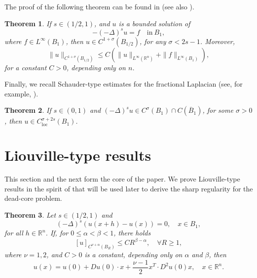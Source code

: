 \documentclass[11pt,reqno]{amsart}
\newtheorem{theorem}{Theorem}
\numberwithin{equation}{section}
\numberwithin{theorem}{section}
\numberwithin{lemma}{section}
\numberwithin{corollary}{section}
\numberwithin{remark}{section}
\numberwithin{proposition}{section}
\numberwithin{definition}{section}
\newcommand{\R}{\mathbb{R}}
\newcommand{\loc}{\operatorname{loc}}
\begin{document}
The proof of the following theorem can be found in \cite[Theorem 61]{CS11} (see also \cite[Theorem 52]{CS11}).

\begin{theorem}\label{CNtheorem}
If $s\in\left(1/2,1\right)$, and $u$ is a bounded solution of
$$
-(-\Delta)^su=f \quad \textrm{in} \ B_1,
$$
where $f\in L^\infty(B_1)$, then $u\in C^{1+\sigma}(B_{1/2})$, for any $\sigma<2s-1$. Moreover,
$$
\|u\|_{C^{1+\sigma}(B_{1/2})}\le C\left(\|u\|_{L^\infty(\R^n)}+\|f\|_{L^\infty(B_1)}\right),
$$
for a constant $C>0$, depending only on $n$.
\end{theorem}

Finally, we recall Schauder-type estimates for the fractional Laplacian (see, for example, \cite[Remark 9.1]{T24}).

\begin{theorem}\label{Schauder}
    If $s\in(0,1)$ and $(-\Delta)^su\in C^\sigma (B_1)\cap C(\overline{B}_1)$, for some $\sigma>0$, then $u\in C_{\loc}^{\sigma+2s}(B_1)$.
\end{theorem}

\medskip

\section{Liouville-type results}\label{s3}

This section and the next form the core of the paper. We prove Liouville-type results in the spirit of \cite{S15, HY} that will be used later to derive the sharp regularity for the dead-core problem.

\begin{theorem}\label{SeminormGrowth}
    Let $s\in(1/2,1)$ and
    \begin{equation}\label{Zeroquotient}
    (-\Delta)^s \left( u(x+h)-u(x) \right)=0, \quad x\in B_1,  
    \end{equation}    
    for all $h\in\R^n$. If, for $0\le\alpha<\beta<1$, there holds
    \begin{equation}\label{crescimento da norma}
    [u]_{C^{\nu+\alpha}(B_R)}\le CR^{\beta-\alpha},\quad \forall R\ge1,
    \end{equation}
    where $\nu=1,2$, and $C>0$ is a constant, depending only on $\alpha$ and $\beta$, then 
    $$
    u(x)=u(0)+Du(0) \cdot x+ \frac{\nu-1}{2} x^T \cdot D^2u(0) x, \quad x\in\R^n.
    $$
\end{theorem}
\end{document}
